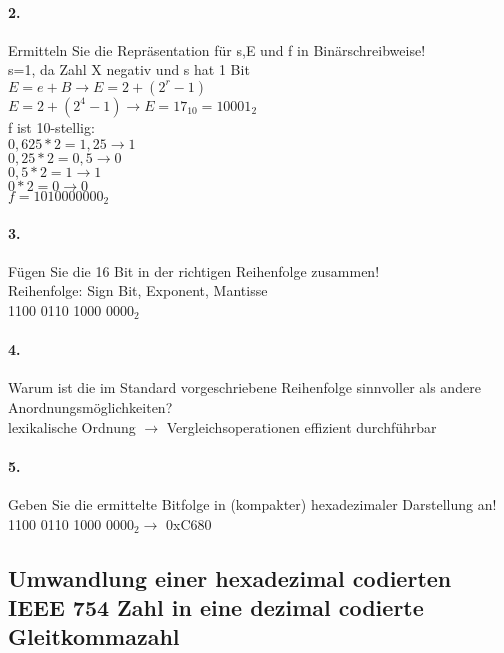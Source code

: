 \documentclass[paper=a4, fontsize=11pt]{scrartcl}
\numberwithin{equation}{section}
\numberwithin{figure}{section}
\numberwithin{table}{section}
\begin{document}
\paragraph{2.}
Ermitteln Sie die Repräsentation für s,E und f in Binärschreibweise! \\

s=1, da Zahl X negativ und s hat 1 Bit \\
$E = e+B \rightarrow E=2+(2^{r}-1)$ \\
$E = 2+(2^{4}-1) \rightarrow E=17_{10} = 10001_{2}$ \\
f ist 10-stellig: \\

$0,625*2= 1,25 \rightarrow 1$ \\
$0,25 *2= 0,5  \rightarrow 0$ \\
$0,5  *2= 1    \rightarrow 1$ \\
$0    *2= 0    \rightarrow 0$ \\
$f=1010 0000 00_{2}$

\paragraph{3.}
Fügen Sie die 16 Bit in der richtigen Reihenfolge zusammen! \\

Reihenfolge: Sign Bit, Exponent, Mantisse \\
1100 0110 1000 000$0_{2}$

\paragraph{4.}
Warum ist die im Standard vorgeschriebene Reihenfolge sinnvoller als andere Anordnungsmöglichkeiten? \\

lexikalische Ordnung $\rightarrow$ Vergleichsoperationen effizient durchführbar

\paragraph{5.}
Geben Sie die ermittelte Bitfolge in (kompakter) hexadezimaler Darstellung an! \\

1100 0110 1000 000$0_{2} \rightarrow$ 0xC680


\subsection{Umwandlung einer hexadezimal codierten IEEE 754 Zahl in eine dezimal codierte Gleitkommazahl}
\end{document}
